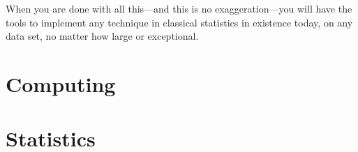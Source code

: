 \documentclass[12pt,notitlepage, openany]{book}
\def\startonecol{\end{multicols}}
\def\endonecol{\begin{multicols}{2}}
\def\startonecol{}
\def\endonecol{}
\begin{document}
\begin{multicols}{2}
When you are done with all this---and this is no exaggeration---you will
have the tools to implement any technique in classical statistics in
existence today, on any data set, no matter how large or exceptional.


\startonecol \part{Computing} \endonecol





\startonecol \part{Statistics} \endonecol




%
\citeindexfalse
\nocite{*}
\backmatter

\iftwocol \end{multicols} \fi
 
\printindex
\end{document}
